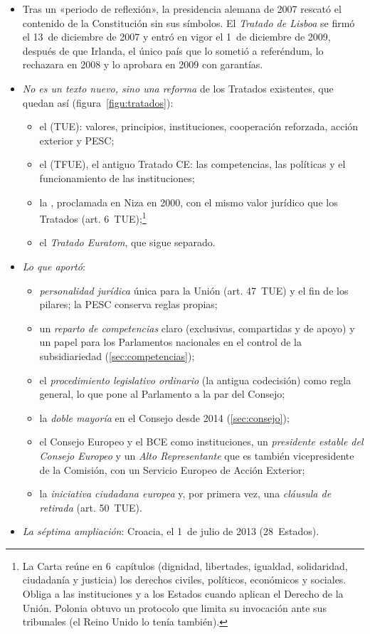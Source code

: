 \documentclass[11pt]{article}
\begin{document}
\begin{itemize}
\item Tras un «periodo de reflexión», la presidencia alemana de 2007 rescató el contenido de la Constitución sin sus símbolos. El \emph{Tratado de Lisboa} se firmó el 13~de diciembre de 2007 y entró en vigor el 1~de diciembre de 2009, después de que Irlanda, el único país que lo sometió a referéndum, lo rechazara en 2008 y lo aprobara en 2009 con garantías.
\item \emph{No es un texto nuevo, sino una reforma} de los Tratados existentes, que quedan así (figura~\ref{figu:tratados}):
  \begin{itemize}
  \item el  (TUE): valores, principios, instituciones, cooperación reforzada, acción exterior y PESC;
  \item el  (TFUE), el antiguo Tratado CE: las competencias, las políticas y el funcionamiento de las instituciones;
  \item la , proclamada en Niza en 2000, con el mismo valor jurídico que los Tratados (art. 6~TUE)\nocite{UE2016Carta};\footnote{La Carta reúne en 6~capítulos (dignidad, libertades, igualdad, solidaridad, ciudadanía y justicia) los derechos civiles, políticos, económicos y sociales. Obliga a las instituciones y a los Estados cuando aplican el Derecho de la Unión. Polonia obtuvo un protocolo que limita su invocación ante sus tribunales (el Reino Unido lo tenía también).}
  \item el \emph{Tratado Euratom}, que sigue separado.
  \end{itemize}
\item \emph{Lo que aportó}:
  \begin{itemize}
  \item \emph{personalidad jurídica} única para la Unión (art. 47~TUE) y el fin de los pilares; la PESC conserva reglas propias;
  \item un \emph{reparto de competencias} claro (exclusivas, compartidas y de apoyo) y un papel para los Parlamentos nacionales en el control de la subsidiariedad (\ref{sec:competencias});
  \item el \emph{procedimiento legislativo ordinario} (la antigua codecisión) como regla general, lo que pone al Parlamento a la par del Consejo;
  \item la \emph{doble mayoría} en el Consejo desde 2014 (\ref{sec:consejo});
  \item el Consejo Europeo y el BCE como instituciones, un \emph{presidente estable del Consejo Europeo} y un \emph{Alto Representante} que es también vicepresidente de la Comisión, con un Servicio Europeo de Acción Exterior;
  \item la \emph{iniciativa ciudadana europea} y, por primera vez, una \emph{cláusula de retirada} (art. 50~TUE).
  \end{itemize}
\item \emph{La séptima ampliación}: Croacia, el 1~de julio de 2013 (28~Estados).
\end{itemize}
\end{document}
